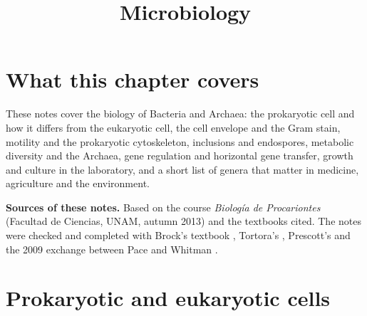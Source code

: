



\title{Microbiology}
\maketitle

\label{section-phantom}

\tableofcontents

\section{What this chapter covers}
\label{section-overview}

These notes cover the biology of Bacteria and
Archaea: the prokaryotic cell and how it
differs from the eukaryotic cell, the cell
envelope and the Gram stain, motility and the
prokaryotic cytoskeleton, inclusions and
endospores, metabolic diversity and the
Archaea, gene regulation and horizontal gene
transfer, growth and culture in the
laboratory, and a short list of genera that
matter in medicine, agriculture and the
environment.

\textbf{Sources of these notes.} Based on
the course \emph{Biolog\'ia de Procariontes}
(Facultad de Ciencias, UNAM, autumn 2013)
and the textbooks cited.
The notes were checked and completed with
Brock's textbook \cite{madigan2012brock},
Tortora's \cite{tortora2013microbiology},
Prescott's \cite{willey2008prescott} and the
2009 exchange between Pace and Whitman
\cite{pace2009problems, whitman2009modern,
pace2009rebuttal, whitman2009rebuttal}.

\section{Prokaryotic and eukaryotic cells}
\label{section-prokaryotic-eukaryotic}

